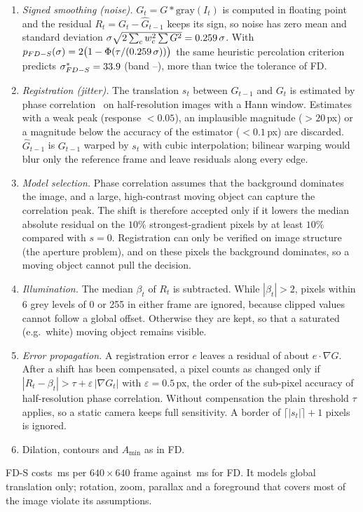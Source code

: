 \documentclass[12pt,a4paper]{article}
\theoremstyle{plain}
\theoremstyle{definition}
\newcommand{\FD}{FD}
\newcommand{\FDS}{FD-S}
\begin{document}
\begin{enumerate}
\item \emph{Signed smoothing (noise).} $G_t=G*\mathrm{gray}(I_t)$ is computed in floating point and the residual $R_t=G_t-\hat G_{t-1}$ keeps its sign, so noise has zero mean and standard deviation $\sigma\sqrt{2\sum_c w_c^2\sum G^2}=0.259\,\sigma$. With $p_{\FDS}(\sigma)=2\bigl(1-\Phi(\tau/(\RobustSdCoef\,\sigma))\bigr)$ the same heuristic percolation criterion predicts $\sigma^*_{\FDS}=\PredSigmaPcFDS$ (band \PredSigmaLoFDS--\PredSigmaHiFDS), more than twice the tolerance of \FD.
\item \emph{Registration (jitter).} The translation $s_t$ between $G_{t-1}$ and $G_t$ is estimated by phase correlation~\cite{kuglin1975phase} on half-resolution images with a Hann window. Estimates with a weak peak (response $<0.05$), an implausible magnitude ($>20$\,px) or a magnitude below the accuracy of the estimator ($<0.1$\,px) are discarded. $\hat G_{t-1}$ is $G_{t-1}$ warped by $s_t$ with cubic interpolation; bilinear warping would blur only the reference frame and leave residuals along every edge.
\item \emph{Model selection.} Phase correlation assumes that the background dominates the image, and a large, high-contrast moving object can capture the correlation peak. The shift is therefore accepted only if it lowers the median absolute residual on the $10\%$ strongest-gradient pixels by at least $10\%$ compared with $s=0$. Registration can only be verified on image structure (the aperture problem), and on these pixels the background dominates, so a moving object cannot pull the decision.
\item \emph{Illumination.} The median $\beta_t$ of $R_t$ is subtracted. While $|\beta_t|>2$, pixels within 6 grey levels of 0 or 255 in either frame are ignored, because clipped values cannot follow a global offset. Otherwise they are kept, so that a saturated (e.g.\ white) moving object remains visible.
\item \emph{Error propagation.} A registration error $e$ leaves a residual of about $e\cdot\nabla G$. After a shift has been compensated, a pixel counts as changed only if $|R_t-\beta_t|>\tau+\varepsilon\,|\nabla G_t|$ with $\varepsilon=0.5$\,px, the order of the sub-pixel accuracy of half-resolution phase correlation. Without compensation the plain threshold $\tau$ applies, so a static camera keeps full sensitivity. A border of $\lceil|s_t|\rceil+1$ pixels is ignored.
\item Dilation, contours and $A_{\min}$ as in \FD.
\end{enumerate}
\FDS{} costs \GateMsFDS\,ms per $640\times640$ frame against \GateMsFD\,ms for \FD. It models global translation only; rotation, zoom, parallax and a foreground that covers most of the image violate its assumptions.
\end{document}
